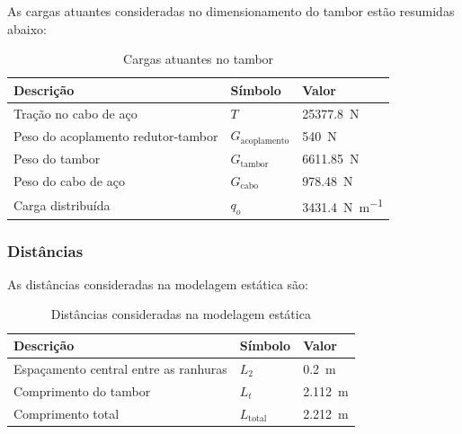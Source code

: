 As cargas atuantes consideradas no dimensionamento do tambor estão resumidas abaixo:

\begin{table}[H]
  \centering
  \caption{Cargas atuantes no tambor}
  \label{tab:cargas_atuantes_tambor}
  \begin{tabularx}{\textwidth}{>{\centering\arraybackslash}X>{\centering\arraybackslash}X>{\centering\arraybackslash}X}
    \toprule
    Descrição                          & Símbolo                  & Valor                            \\
    \midrule
    Tração no cabo de aço              & $T$                      & \SI{25377.8}{\newton}          \\
    Peso do acoplamento redutor-tambor & $G_{\text{acoplamento}}$ & \SI{540}{\newton}                \\
    Peso do tambor                     & $G_{\text{tambor}}$      & \SI{6611.85}{\newton}          \\
    Peso do cabo de aço                & $G_{\text{cabo}}$        & \SI{978.48}{\newton}           \\
    Carga distribuída                  & $q_o$                    & \SI{3431.4}{\newton\per\meter} \\
    \bottomrule
  \end{tabularx}
\end{table}

\subsubsection{Distâncias}

As distâncias consideradas na modelagem estática são:

\begin{table}[H]
  \centering
  \caption{Distâncias consideradas na modelagem estática}
  \label{tab:distancias_consideradas_modelagem_estatica}
  \begin{tabularx}{\textwidth}{>{\centering\arraybackslash}X>{\centering\arraybackslash}X>{\centering\arraybackslash}X}
    \toprule
    Descrição                             & Símbolo            & Valor                \\
    \midrule
    Espaçamento central entre as ranhuras & $L_2$              & \SI{0.2}{\meter}    \\
    Comprimento do tambor                 & $L_t$              & \SI{2.112}{\meter} \\
    Comprimento total                     & $L_{\text{total}}$ & \SI{2.212}{\meter} \\
    \bottomrule
  \end{tabularx}
\end{table}

